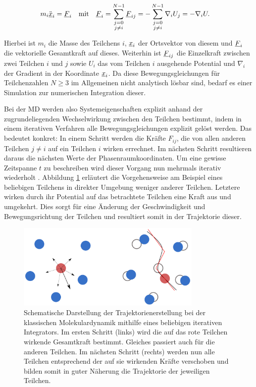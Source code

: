 		\begin{align}
			m_i \ddot{\underline{x}}_i &= \underline{F}_i
			& \text{mit} &&
			\underline{F}_{i} &= \sum_{\substack{j=0\\j \neq i}}^{N-1} \underline{F}_{ij}
			= -\sum_{\substack{j=0\\j \neq i}}^{N-1} \nabla_i U_j = -\nabla_i U
			\label{eq:newtone_dgl}
			.
		\end{align}

		Hierbei ist $m_i$ die Masse des Teilchens $i$, $\underline{x}_i$ der Ortsvektor von diesem und
		$\underline{F}_{i}$ die vektorielle Gesamtkraft auf dieses. Weiterhin ist $\underline{F}_{ij}$ die
		Einzelkraft zwischen zwei Teilchen $i$ und $j$ sowie $U_i$ das vom Teilchen $i$ ausgehende
		Potential und $\nabla_i$ der Gradient in der Koordinate $\underline{x}_i$. Da diese
		Bewegungsgleichungen für Teilchenzahlen $N \geq 3$ im Allgemeinen nicht analytisch lösbar
		sind, %
		bedarf es einer Simulation zur numerischen Integration dieser.

		Bei der MD werden also Systemeigenschaften explizit anhand der zugrundeliegenden
		Wechselwirkung zwischen den Teilchen bestimmt, indem in einem iterativen Verfahren alle
		Bewegungsgleichungen explizit gelöst werden. Das bedeutet konkret: In einem Schritt werden
		die Kräfte $F_{ij}$, die von allen anderen Teilchen $j \neq i$ auf ein Teilchen $i$ wirken
		errechnet. Im nächsten Schritt resultieren daraus die nächsten Werte der
		Phasenraumkoordinaten. Um eine gewisse Zeitspanne $t$ zu beschreiben wird dieser Vorgang
		nun mehrmals iterativ wiederholt \cite{allen2004introduction}. Abbildung
		\ref{fig:scheme_md} erläutert die Vorgehensweise am Beispiel eines beliebigen Teilchens in
		direkter Umgebung weniger anderer Teilchen. Letztere wirken durch ihr Potential auf das
		betrachtete Teilchen eine Kraft aus und umgekehrt. Dies sorgt für eine Änderung der
		Geschwindigkeit und Bewegungsrichtung der Teilchen und resultiert somit in der Trajektorie
		dieser.

		\begin{figure}[!ht]
			\centering
			\includegraphics[width=0.8\textwidth]{chapter/main/img/scheme_md.png}
			\caption{Schematische Darstellung der Trajektorienerstellung bei der klassischen
			Molekulardynamik mithilfe eines beliebigen iterativen Integrators. Im ersten Schritt
			(links) wird die auf das rote Teilchen wirkende Gesamtkraft bestimmt. Gleiches
			passiert auch für die anderen Teilchen. Im nächsten Schritt (rechts) werden nun alle
			Teilchen entsprechend der auf sie wirkenden Kräfte verschoben und bilden somit in
			guter Näherung die Trajektorie der jeweiligen Teilchen.
			\cite{sonntag2011computer}}
			\label{fig:scheme_md}
		\end{figure}

